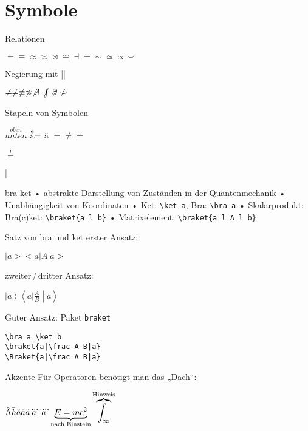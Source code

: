 \section{Symbole}
\begin{frame}[fragile]{Relationen}
\begin{LTXexample}
$= \equiv \approx \asymp \bowtie \cong \dashv \doteq \sim \simeq \propto \smile$
\end{LTXexample}
\pause Negierung mit |\not|
\begin{LTXexample} 
$\not = \neq \not\equiv
\not \approx \not A
\not\kern-.2em\int \not\kern-.2em\partial \not \smile$
\end{LTXexample}
\pause Stapeln von Symbolen
\begin{LTXexample}
$\stackrel{oben}{unten}$
$\stackrel{\text e}{\text a} = $ ä
$\stackrel . = \neq \doteq$
\end{LTXexample}
\hfill$\stackrel \exclam=$
\end{frame}

\DeleteShortVerb|
\begin{frame}[fragile]{bra ket}
• abstrakte Darstellung von Zuständen in der Quantenmechanik
• Unabhängigkeit von Koordinaten
• Ket: \verb|\ket a|, Bra: \verb|\bra a|
• Skalarprodukt: Bra(c)ket: \verb|\braket{a l b}|
• Matrixelement: \verb|\braket{a l A l b}|
\•
\end{frame}

\begin{frame}[fragile]{Satz von bra und ket}
erster Ansatz:
\begin{LTXexample}
$|a> <a|A|a>$
\end{LTXexample}
\pause zweiter\,/\,dritter Ansatz:
\begin{LTXexample} 
$\left|a\right>
\left<a|\frac A B \middle|a\right>$
\end{LTXexample}
\pause Guter Ansatz: Paket \verb|braket|
\begin{verbatim}
\bra a \ket b
\braket{a|\frac A B|a}
\Braket{a|\frac A B|a}
\end{verbatim}
\end{frame}

\begin{frame}[fragile]{Akzente}
Für Operatoren benötigt man das „Dach“:
\begin{LTXexample}[width=.4\textwidth]
$\hat{\mathrm{A}} \bar h \check a \dot a\\
\ddot a \dddot a \ddddot a\\
\underbrace{E = mc^2}_\text{nach Einstein}\overbrace{\int_\infty}^{\text{Hinweis}}$
\end{LTXexample}
\end{frame}

